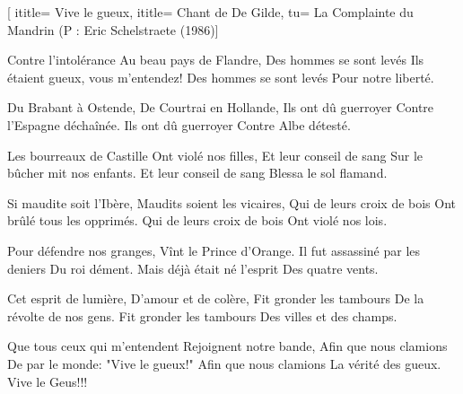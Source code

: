 [
ititle= {Vive le gueux},
ititle= {Chant de De Gilde},
tu= {La Complainte du Mandrin (P : Eric Schelstraete (1986)}]


\beginverse
Contre l'intolérance
Au beau pays de Flandre,
Des hommes se sont levés
Ils étaient gueux, vous m'entendez!
Des hommes se sont levés
Pour notre liberté.
\endverse

\beginverse
Du Brabant à Ostende,
De Courtrai en Hollande,
Ils ont dû guerroyer
Contre l'Espagne déchaînée.
Ils ont dû guerroyer
Contre Albe détesté.
\endverse

\beginverse
Les bourreaux de Castille
Ont violé nos filles,
Et leur conseil de sang
Sur le bûcher mit nos enfants.
Et leur conseil de sang
Blessa le sol flamand.
\endverse

\beginverse
Si maudite soit l'Ibère,
Maudits soient les vicaires,
Qui de leurs croix de bois
Ont brûlé tous les opprimés.
Qui de leurs croix de bois
Ont violé nos lois.
\endverse

\beginverse
Pour défendre nos granges,
Vînt le Prince d'Orange.
Il fut assassiné par les deniers
Du roi dément.
Mais déjà était né l'esprit
Des quatre vents.
\endverse

\beginverse
Cet esprit de lumière,
D'amour et de colère,
Fit gronder les tambours
De la révolte de nos gens.
Fit gronder les tambours
Des villes et des champs.
\endverse

\beginverse
Que tous ceux qui m'entendent
Rejoignent notre bande,
Afin que nous clamions
De par le monde: "Vive le gueux!"
Afin que nous clamions
La vérité des gueux.
Vive le Geus!!!
\endverse

\endsong
